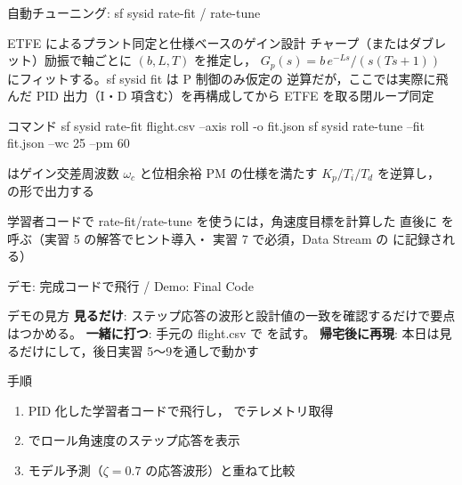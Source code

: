 \begin{frame}[fragile]{自動チューニング: sf sysid rate-fit / rate-tune}
  \begin{block}{ETFE によるプラント同定と仕様ベースのゲイン設計}\footnotesize
    チャープ（またはダブレット）励振で軸ごとに $(b, L, T)$ を推定し，
    $G_p(s) = b\,e^{-Ls}/(s(Ts+1))$ にフィットする。sf sysid fit は P 制御のみ仮定の
    逆算だが，ここでは実際に飛んだ PID 出力（I・D 項含む）を再構成してから
    ETFE を取る閉ループ同定
  \end{block}

  \begin{sflisting}[basicstyle=\ttfamily\scriptsize]{コマンド}
sf sysid rate-fit flight.csv --axis roll -o fit.json
sf sysid rate-tune --fit fit.json --wc 25 --pm 60
  \end{sflisting}

  \vspace{-0.3em}
  {\footnotesize {} はゲイン交差周波数 $\omega_c$ と位相余裕 PM の仕様を満たす
  $K_p/T_i/T_d$ を逆算し， の形で出力する}

  \vspace{-0.3em}
  {\scriptsize {} 学習者コードで rate-fit/rate-tune を使うには，角速度目標を計算した
  直後に  を呼ぶ（実習 5 の解答でヒント導入・
  実習 7 で必須，Data Stream の  に記録される）}
\end{frame}

\begin{frame}{デモ: 完成コードで飛行 / Demo: Final Code}
  \begin{exampleblock}{デモの見方}\footnotesize
    \textbf{見るだけ}: ステップ応答の波形と設計値の一致を確認するだけで要点はつかめる。
    \textbf{一緒に打つ}: 手元の flight.csv で  を試す。
    \textbf{帰宅後に再現}: 本日は見るだけにして，後日実習 5〜9を通しで動かす
  \end{exampleblock}

  \begin{block}{手順}\footnotesize
    \begin{enumerate}
      \item PID 化した学習者コードで飛行し， でテレメトリ取得
      \item {} でロール角速度のステップ応答を表示
      \item モデル予測（$\zeta=0.7$ の応答波形）と重ねて比較
    \end{enumerate}
  \end{block}
\end{frame}

